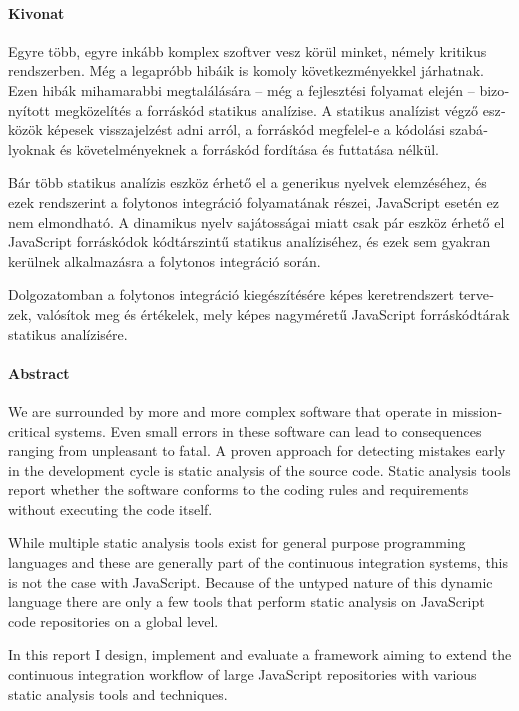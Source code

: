 \begin{otherlanguage}{magyar}

  \paragraph*{Kivonat}
  \thispagestyle{plain}
  {
  \selecthungarian

  Egyre több, egyre inkább komplex szoftver vesz körül minket, némely kritikus rendszerben. Még a legapróbb hibáik is komoly következményekkel járhatnak. Ezen hibák mihamarabbi megtalálására -- még a fejlesztési folyamat elején -- bizonyított megközelítés a forráskód statikus analízise. A statikus analízist végző eszközök képesek visszajelzést adni arról, a forráskód megfelel-e a kódolási szabályoknak és követelményeknek a forráskód fordítása és futtatása nélkül.

  Bár több statikus analízis eszköz érhető el a generikus nyelvek elemzéséhez, és ezek rendszerint a folytonos integráció folyamatának részei, JavaScript esetén ez nem elmondható. A dinamikus nyelv sajátosságai miatt csak pár eszköz érhető el JavaScript forráskódok kódtárszintű statikus analíziséhez, és ezek sem gyakran kerülnek alkalmazásra a folytonos integráció során.

  Dolgozatomban a folytonos integráció kiegészítésére képes keretrendszert tervezek, valósítok meg és értékelek, mely képes nagyméretű JavaScript forráskódtárak statikus analízisére.

  }

\end{otherlanguage}

\cleardoublepage

\paragraph*{Abstract}
{}
\thispagestyle{plain}

We are surrounded by more and more complex software that operate in mission-critical systems. Even small errors in these software can lead to consequences ranging from unpleasant to fatal. A proven approach for detecting mistakes early in the development cycle is static analysis of the source code. Static analysis tools report whether the software conforms to the coding rules and requirements without executing the code itself.

While multiple static analysis tools exist for general purpose programming languages and these are generally part of the continuous integration systems, this is not the case with JavaScript. Because of the untyped nature of this dynamic language there are only a few tools that perform static analysis on JavaScript code repositories on a global level.

In this report I design, implement and evaluate a framework aiming to extend the continuous integration workflow of large JavaScript repositories with various static analysis tools and techniques.

\clearpage
